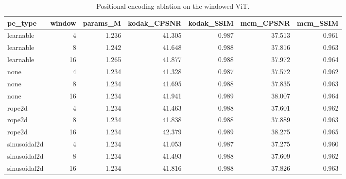 \begin{table}[t]
\centering
\small
\caption{Positional-encoding ablation on the windowed ViT.}
\label{tab:ablation}
\begin{tabular}{lrrrrrr}
\toprule
pe\_type & window & params\_M & kodak\_CPSNR & kodak\_SSIM & mcm\_CPSNR & mcm\_SSIM \\
\midrule
learnable & 4 & 1.236 & 41.305 & 0.987 & 37.513 & 0.961 \\
learnable & 8 & 1.242 & 41.648 & 0.988 & 37.816 & 0.963 \\
learnable & 16 & 1.265 & 41.877 & 0.988 & 37.972 & 0.964 \\
none & 4 & 1.234 & 41.328 & 0.987 & 37.572 & 0.962 \\
none & 8 & 1.234 & 41.695 & 0.988 & 37.835 & 0.963 \\
none & 16 & 1.234 & 41.941 & 0.989 & 38.007 & 0.964 \\
rope2d & 4 & 1.234 & 41.463 & 0.988 & 37.601 & 0.962 \\
rope2d & 8 & 1.234 & 41.838 & 0.988 & 37.889 & 0.963 \\
rope2d & 16 & 1.234 & 42.379 & 0.989 & 38.275 & 0.965 \\
sinusoidal2d & 4 & 1.234 & 41.053 & 0.987 & 37.275 & 0.960 \\
sinusoidal2d & 8 & 1.234 & 41.493 & 0.988 & 37.609 & 0.962 \\
sinusoidal2d & 16 & 1.234 & 41.816 & 0.988 & 37.826 & 0.963 \\
\bottomrule
\end{tabular}
\end{table}
